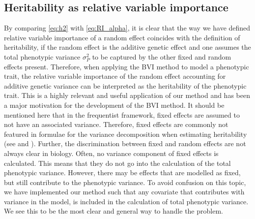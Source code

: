 \subsection{Heritability as relative variable importance}
By comparing \eqref{eq:h2} with \eqref{eq:RI_alpha}, it is clear that the way we have defined relative variable importance of a random effect coincides with the definition of heritability, if the random effect is the additive genetic effect and one assumes the total phenotypic variance $\sigma^2_P$ to be captured by the other fixed and random effects present. Therefore, when applying the BVI method to model a phenotypic trait, the relative variable importance of the random effect accounting for additive genetic variance can be interpreted as the heritability of the phenotypic trait. This is a highly relevant and useful application of our method and has been a major motivation for the development of the BVI method. It should be mentioned here that in the frequentist framework, fixed effects are assumed to not have an associated variance. Therefore, fixed effects are commonly not featured in formulae for the variance decomposition when estimating heritability (see \citet{Kruuk2004} and \citet{Wilson_guide_animal_model}). Further, the discrimination between fixed and random effects are not always clear in biology. Often, no variance component of fixed effects is calculated. This means that they do not go into the calculation of the total phenotypic variance. However, there may be effects that are modelled as fixed, but still contribute to the phenotypic variance. To avoid confusion on this topic, we have implemented our method such that any covariate that contributes with variance in the model, is included in the calculation of total phenotypic variance. We see this to be the most clear and general way to handle the problem.
